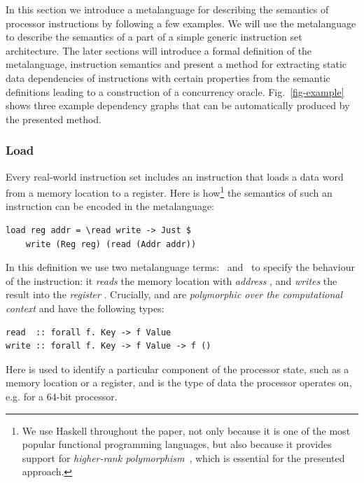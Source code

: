 
In this section we introduce a metalanguage for describing the semantics of
processor instructions by following a few examples. We will use the metalanguage
to describe the semantics of a part of a simple generic instruction set
architecture. The later sections will introduce a formal definition of the
metalanguage, instruction semantics and present a method for
extracting static data dependencies of instructions with certain properties from
the semantic definitions leading to a construction of a concurrency oracle.
Fig.~\ref{fig-example} shows three example dependency graphs that can be
automatically produced by the presented method.

\vspace{-1mm}
\subsubsection{Load} Every real-world instruction set includes an instruction
that loads a data word from a memory location to a register. Here is
how\footnote{We use Haskell throughout the paper, not only because it is one of
the most popular functional programming languages, but also because it provides
support for \emph{higher-rank polymorphism}~\cite{jones2007practical}, which is
essential for the presented approach.} the semantics of such an instruction can
be encoded in the metalanguage:

\begin{verbatim}
load reg addr = \read write -> Just $
    write (Reg reg) (read (Addr addr))
\end{verbatim}

\noindent
In this definition we use two metalanguage terms:~ and~ to
specify the behaviour of the instruction: it \emph{reads} the memory location
with \emph{address} , and \emph{writes} the result into the
\emph{register} . Crucially,  and  are
\emph{polymorphic over the computational context}  and have the following
types:

\begin{verbatim}
read  :: forall f. Key -> f Value
write :: forall f. Key -> f Value -> f ()
\end{verbatim}

\noindent
Here  is used to identify a particular component of the processor state,
such as a memory location or a register, and  is the type of data the
processor operates on, e.g.  for a 64-bit processor.

